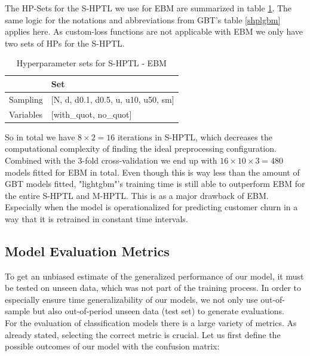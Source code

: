 \documentclass[12pt,titlepage]{article}
\begin{document}
The HP-Sets for the S-HPTL we use for EBM are summarized in table \ref{shpebm}. The same logic for the notations and abbreviations from GBT's table \ref{shplgbm} applies here. As custom-loss functions are not applicable with EBM we only have two sets of HPs for the S-HPTL. \\
\begin{table}[H]
    \centering
    \begin{tabular}{|l|l|}
    \hline
              & Set  \\
    \hline
    Sampling &  [N, d, d0.1, d0.5, u, u10, u50, sm]  \\
    Variables & [with\_quot, no\_quot] \\
    \hline
    \end{tabular}
    \caption{Hyperparameter sets for S-HPTL - EBM}
    \label{shpebm}
\end{table}
\vspace{3mm}
\noindent
So in total we have $8\times2=16$ iterations in S-HPTL, which decreases the computational complexity of finding the ideal preprocessing configuration. Combined with the 3-fold cross-validation we end up with $16\times10\times3=480$ models fitted for EBM in total. Even though this is way less than the amount of GBT models fitted, "lightgbm"'s training time is still able to outperform EBM for the entire S-HPTL and M-HPTL. This is as a major drawback of EBM. Especially when the model is operationalized for predicting customer churn in a way that it is retrained in constant time intervals. \\

\subsection{Model Evaluation Metrics} \par

To get an unbiased estimate of the generalized performance of our model, it must be tested on unseen data, which was not part of the training process. In order to especially ensure time generalizability of our models, we not only use out-of-sample but also out-of-period unseen data (test set) to generate evaluations. \\
For the evaluation of classification models there is a large variety of metrics. As already stated, selecting the correct metric is crucial. Let us first define the possible outcomes of our model with the confusion matrix: \\
\end{document}
